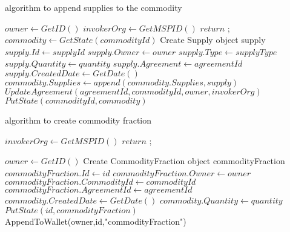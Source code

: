\documentclass[11pt]{article}
\begin{document}

\begin{algorithm}[hbt!]
\caption{algorithm to append supplies to the commodity}\label{alg:two}
$owner \gets GetID()$
$invokerOrg \gets GetMSPID()$
{
    $return$ ;
}
$commodity \gets GetState(commodityId)$ 
Create Supply object supply\;
$supply.Id \gets supplyId$\;
$supply.Owner \gets owner$\;
$supply.Type \gets supplyType$\;
$supply.Quantity \gets quantity$\;
$supply.Agreement \gets agreementId$\;
$supply.CreatedDate \gets GetDate()$\;
$commodity.Supplies \gets append(commodity.Supplies,supply)$ 
$UpdateAgreement(agreementId,commodityId,owner,invokerOrg)$ 
$PutState(commodityId, commodity)$ 
\end{algorithm}


\begin{algorithm}[hbt!]
\caption{algorithm to create commodity fraction}\label{alg:one}
$invokerOrg \gets GetMSPID()$
{
    $return$ ;
}
{
}

$owner \gets GetID()$
Create CommodityFraction object commodityFraction\;
$commodityFraction.Id \gets id$\;
$commodityFraction.Owner \gets owner$\;
$commodityFraction.CommodityId \gets  commodityId$\;
$commodityFraction.AgreementId \gets  agreementId$\;
$commodity.CreatedDate \gets  GetDate()$\;
$commodity.Quantity \gets quantity$\;
$PutState(id,commodityFraction)$ 
AppendToWallet(owner,id,"commodityFraction")

\end{algorithm}
\end{document}
